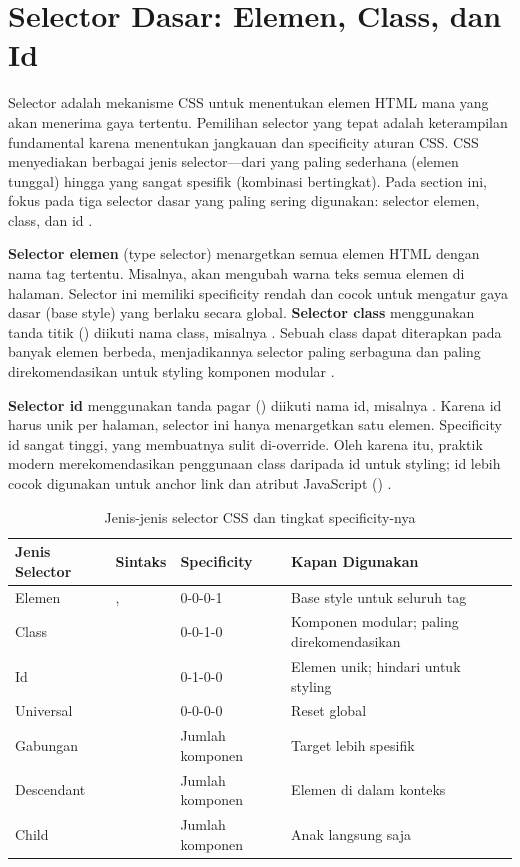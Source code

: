 ﻿\section{Selector Dasar: Elemen, Class, dan Id}

Selector adalah mekanisme CSS untuk menentukan elemen HTML mana yang akan menerima gaya tertentu. Pemilihan selector yang tepat adalah keterampilan fundamental karena menentukan jangkauan dan specificity aturan CSS. CSS menyediakan berbagai jenis selector---dari yang paling sederhana (elemen tunggal) hingga yang sangat spesifik (kombinasi bertingkat). Pada section ini, fokus pada tiga selector dasar yang paling sering digunakan: selector elemen, class, dan id \cite{mdnCss}.

\textbf{Selector elemen} (type selector) menargetkan semua elemen HTML dengan nama tag tertentu. Misalnya,  akan mengubah warna teks semua elemen  di halaman. Selector ini memiliki specificity rendah dan cocok untuk mengatur gaya dasar (base style) yang berlaku secara global. \textbf{Selector class} menggunakan tanda titik () diikuti nama class, misalnya . Sebuah class dapat diterapkan pada banyak elemen berbeda, menjadikannya selector paling serbaguna dan paling direkomendasikan untuk styling komponen modular \cite{webdevCss}.

\textbf{Selector id} menggunakan tanda pagar (\code{\#}) diikuti nama id, misalnya . Karena id harus unik per halaman, selector ini hanya menargetkan satu elemen. Specificity id sangat tinggi, yang membuatnya sulit di-override. Oleh karena itu, praktik modern merekomendasikan penggunaan class daripada id untuk styling; id lebih cocok digunakan untuk anchor link dan atribut JavaScript () \cite{cssTricks}.

\begin{table}[H]
\centering
\begin{tabular}{|P{2.5cm}|P{2.5cm}|P{3cm}|P{4cm}|}
\hline
\textbf{Jenis Selector} & \textbf{Sintaks} & \textbf{Specificity} & \textbf{Kapan Digunakan} \\
\hline
Elemen & ,  & 0-0-0-1 & Base style untuk seluruh tag \\
\hline
Class &  & 0-0-1-0 & Komponen modular; paling direkomendasikan \\
\hline
Id &  & 0-1-0-0 & Elemen unik; hindari untuk styling \\
\hline
Universal & \code{*} & 0-0-0-0 & Reset global \\
\hline
Gabungan &  & Jumlah komponen & Target lebih spesifik \\
\hline
Descendant &  & Jumlah komponen & Elemen di dalam konteks \\
\hline
Child &  & Jumlah komponen & Anak langsung saja \\
\hline
\end{tabular}
\caption{Jenis-jenis selector CSS dan tingkat specificity-nya}
\end{table}

